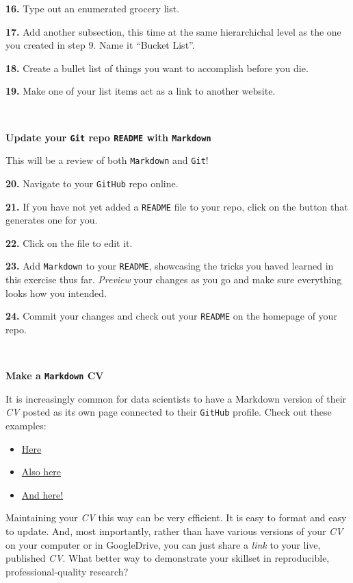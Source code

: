 \documentclass[
]{book}
\providecommand{\tightlist}{%
  \setlength{\itemsep}{0pt}\setlength{\parskip}{0pt}}
\begin{document}
\textbf{16.} Type out an enumerated grocery list.

\textbf{17.} Add another subsection, this time at the same hierarchichal level as the one you created in step 9. Name it ``Bucket List''.

\textbf{18.} Create a bullet list of things you want to accomplish before you die.

\textbf{19.} Make one of your list items act as a link to another website.

~

\textbf{Update your \texttt{Git} repo \texttt{README} with \texttt{Markdown}}

This will be a review of both \texttt{Markdown} and \texttt{Git}!

\textbf{20.} Navigate to your \texttt{GitHub} repo online.

\textbf{21.} If you have not yet added a \texttt{README} file to your repo, click on the button that generates one for you.

\textbf{22.} Click on the file to edit it.

\textbf{23.} Add \texttt{Markdown} to your \texttt{README}, showcasing the tricks you haved learned in this exercise thus far. \emph{Preview} your changes as you go and make sure everything looks how you intended.

\textbf{24.} Commit your changes and check out your \texttt{README} on the homepage of your repo.

~

\textbf{Make a \texttt{Markdown} CV}

It is increasingly common for data scientists to have a Markdown version of their \emph{CV} posted as its own page connected to their \texttt{GitHub} profile. Check out these examples:

\begin{itemize}
\tightlist
\item
  \href{https://carolstran.github.io/cv/}{Here}\\
\item
  \href{https://github.com/ViliamV/easy-markdown-cv}{Also here}\\
\item
  \href{http://wodenimoni.com/nimo-markdown-cv/}{And here!}
\end{itemize}

Maintaining your \emph{CV} this way can be very efficient. It is easy to format and easy to update. And, most importantly, rather than have various versions of your \emph{CV} on your computer or in GoogleDrive, you can just share a \emph{link} to your live, published \emph{CV}. What better way to demonstrate your skillset in reproducible, professional-quality research?
\end{document}
